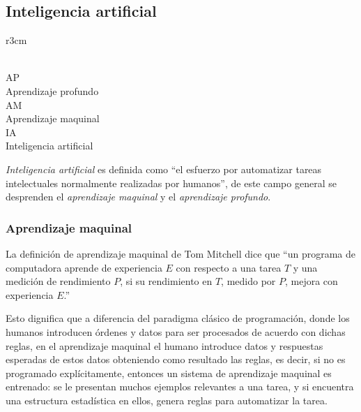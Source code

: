 \subsection {Inteligencia artificial}\label{subsec:intela}
\begin{wrapfigure}{r}{3cm}
	\centering\\
AP\\
Aprendizaje profundo\\
AM\\
Aprendizaje maquinal\\
IA\\
Inteligencia artificial
\end{wrapfigure}\cite{cho18}\label{fig:AI}
\emph{Inteligencia artificial} es definida como ``el esfuerzo por automatizar tareas intelectuales normalmente realizadas por humanos''\cite{cho18}, de este campo general se desprenden el \emph{aprendizaje maquinal} y el \emph{aprendizaje profundo}.



\subsubsection {Aprendizaje maquinal}\label{subsec:machinel}
La definición de aprendizaje maquinal de Tom Mitchell\cite{mich19} dice que ``un programa de computadora aprende de experiencia $E$ con respecto a una tarea $T$ y una medición de rendimiento $P$, si su rendimiento en $T$, medido por $P$, mejora con experiencia $E$.''

Esto dignifica que a diferencia del paradigma clásico de programación, donde los humanos introducen órdenes y datos para ser procesados de acuerdo con dichas reglas, en el aprendizaje maquinal el humano introduce datos y respuestas esperadas de estos datos obteniendo como resultado las reglas, es decir, si no es programado explícitamente, entonces un sistema de aprendizaje maquinal es entrenado: se le presentan muchos ejemplos relevantes a una tarea, y si encuentra una estructura estadística en ellos, genera reglas para automatizar la tarea.
